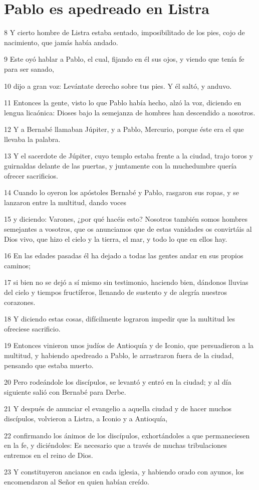 \section*{Pablo es apedreado en Listra}

\par 8 Y cierto hombre de Listra estaba sentado, imposibilitado de los pies, cojo de nacimiento, que jamás había andado.
\par 9 Este oyó hablar a Pablo, el cual, fijando en él sus ojos, y viendo que tenía fe para ser sanado,
\par 10 dijo a gran voz: Levántate derecho sobre tus pies. Y él saltó, y anduvo.
\par 11 Entonces la gente, visto lo que Pablo había hecho, alzó la voz, diciendo en lengua licaónica: Dioses bajo la semejanza de hombres han descendido a nosotros.
\par 12 Y a Bernabé llamaban Júpiter, y a Pablo, Mercurio, porque éste era el que llevaba la palabra.
\par 13 Y el sacerdote de Júpiter, cuyo templo estaba frente a la ciudad, trajo toros y guirnaldas delante de las puertas, y juntamente con la muchedumbre quería ofrecer sacrificios.
\par 14 Cuando lo oyeron los apóstoles Bernabé y Pablo, rasgaron sus ropas, y se lanzaron entre la multitud, dando voces
\par 15 y diciendo: Varones, ¿por qué hacéis esto? Nosotros también somos hombres semejantes a vosotros, que os anunciamos que de estas vanidades os convirtáis al Dios vivo, que hizo el cielo y la tierra, el mar, y todo lo que en ellos hay.
\par 16 En las edades pasadas él ha dejado a todas las gentes andar en sus propios caminos;
\par 17 si bien no se dejó a sí mismo sin testimonio, haciendo bien, dándonos lluvias del cielo y tiempos fructíferos, llenando de sustento y de alegría nuestros corazones.
\par 18 Y diciendo estas cosas, difícilmente lograron impedir que la multitud les ofreciese sacrificio.
\par 19 Entonces vinieron unos judíos de Antioquía y de Iconio, que persuadieron a la multitud, y habiendo apedreado a Pablo, le arrastraron fuera de la ciudad, pensando que estaba muerto.
\par 20 Pero rodeándole los discípulos, se levantó y entró en la ciudad; y al día siguiente salió con Bernabé para Derbe.
\par 21 Y después de anunciar el evangelio a aquella ciudad y de hacer muchos discípulos, volvieron a Listra, a Iconio y a Antioquía,
\par 22 confirmando los ánimos de los discípulos, exhortándoles a que permaneciesen en la fe, y diciéndoles: Es necesario que a través de muchas tribulaciones entremos en el reino de Dios.
\par 23 Y constituyeron ancianos en cada iglesia, y habiendo orado con ayunos, los encomendaron al Señor en quien habían creído.

